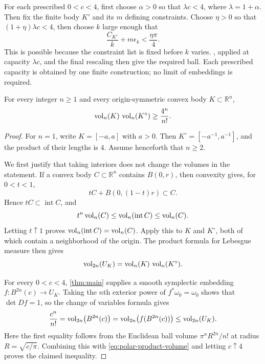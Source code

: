 \begin{remark}
\label{rem:parameter-order}
For each prescribed $0<c<4$, first choose $\alpha>0$ so that $\lambda c<4$, where $\lambda=1+\alpha$. Then fix the finite body $K'$ and its $m$ defining constraints. Choose $\eta>0$ so that $(1+\eta)\lambda c<4$, then choose $k$ large enough that
\[
 \frac{C_{K'}}k+m\epsilon_k<\frac{\eta\pi}{4}.
\]
This is possible because the constraint list is fixed before $k$ varies. , applied at capacity $\lambda c$, and the final rescaling then give the required ball. Each prescribed capacity is obtained by one finite construction; no limit of embeddings is required.
\end{remark}

\begin{corollary}
\label{cor:mahler}
For every integer $n\ge1$ and every origin-symmetric convex body $K\subset\mathbb{R}^n$,
\[
 \operatorname{vol}_n(K)\,\operatorname{vol}_n(K^\circ)\ge\frac{4^n}{n!}.
\]
\end{corollary}

\begin{proof}
For $n=1$, write $K=[-a,a]$ with $a>0$. Then $K^\circ=[-a^{-1},a^{-1}]$, and the product of their lengths is $4$. Assume henceforth that $n\ge2$.

We first justify that taking interiors does not change the volumes in the statement. If a convex body $C\subset\mathbb{R}^n$ contains $B(0,r)$, then convexity gives, for $0<t<1$,
\[
 tC+B(0,(1-t)r)\subset C.
\]
Hence $tC\subset\operatorname{int} C$, and
\[
 t^n\operatorname{vol}_n(C)\le\operatorname{vol}_n(\operatorname{int} C)\le\operatorname{vol}_n(C).
\]
Letting $t\uparrow1$ proves $\operatorname{vol}_n(\operatorname{int} C)=\operatorname{vol}_n(C)$. Apply this to $K$ and $K^\circ$, both of which contain a neighborhood of the origin. The product formula for Lebesgue measure then gives
\begin{equation}\label{eq:polar-product-volume}
 \operatorname{vol}_{2n}(U_K)=\operatorname{vol}_n(K)\,\operatorname{vol}_n(K^\circ).
\end{equation}

For every $0<c<4$, \cref{thm:main} supplies a smooth symplectic embedding $f:B^{2n}(c)\to U_K$. Taking the $n$th exterior power of $f^*\omega_0=\omega_0$ shows that $\det Df=1$, so the change of variables formula gives
\[
 \frac{c^n}{n!}
 =\operatorname{vol}_{2n}\bigl(B^{2n}(c)\bigr)
 =\operatorname{vol}_{2n}\bigl(f(B^{2n}(c))\bigr)
 \le\operatorname{vol}_{2n}(U_K).
\]
Here the first equality follows from the Euclidean ball volume $\pi^nR^{2n}/n!$ at radius $R=\sqrt{c/\pi}$. Combining this with \eqref{eq:polar-product-volume} and letting $c\uparrow4$ proves the claimed inequality.
\end{proof}

